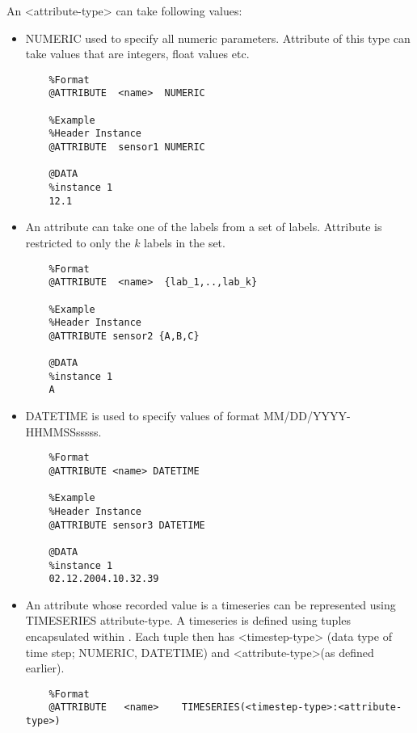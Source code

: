 An <attribute-type> can take following values:
\begin{itemize}
\item NUMERIC used to specify all numeric parameters. Attribute of this type can take values that are integers, float values etc.
\begin{verbatim}
    %Format
    @ATTRIBUTE  <name>  NUMERIC

    %Example
    %Header Instance
    @ATTRIBUTE  sensor1 NUMERIC
    
    @DATA 
    %instance 1
    12.1
\end{verbatim}
\item An attribute can take one of the labels from a set of labels. Attribute is restricted to only the $k$ labels in the set.
\begin{verbatim}
    %Format
    @ATTRIBUTE  <name>  {lab_1,..,lab_k}  
    
    %Example
    %Header Instance
    @ATTRIBUTE sensor2 {A,B,C}
    
    @DATA
    %instance 1
    A
\end{verbatim}
\item DATETIME is used to specify values of format MM/DD/YYYY-HHMMSSsssss.
\begin{verbatim}
    %Format
    @ATTRIBUTE <name> DATETIME
    
    %Example
    %Header Instance
    @ATTRIBUTE sensor3 DATETIME

    @DATA
    %instance 1
    02.12.2004.10.32.39
\end{verbatim}
\item An attribute whose recorded value is a timeseries can be represented using TIMESERIES attribute-type. A timeseries is defined using tuples encapsulated within { }. Each tuple then has <timestep-type> (data type of time step; NUMERIC, DATETIME) and <attribute-type>(as defined earlier).
\begingroup
\fontsize{10pt}{10pt}\selectfont
\begin{verbatim}
    %Format
    @ATTRIBUTE   <name>    TIMESERIES(<timestep-type>:<attribute-type>)
    

\end{verbatim}
\end{itemize}
